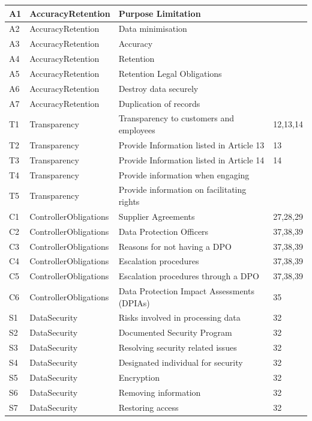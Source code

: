 \begin{center}
\begin{tabularx}{\textwidth}{|l|l|X|l|}
A1 & AccuracyRetention & Purpose Limitation &  \\ \hline
A2 & AccuracyRetention & Data minimisation &  \\ \hline
A3 & AccuracyRetention & Accuracy &  \\ \hline
A4 & AccuracyRetention & Retention &  \\ \hline
A5 & AccuracyRetention & Retention Legal Obligations &  \\ \hline
A6 & AccuracyRetention & Destroy data securely &  \\ \hline
A7 & AccuracyRetention & Duplication of records &  \\ \hline
T1 & Transparency & Transparency to customers and employees & 12,13,14 \\ \hline
T2 & Transparency & Provide Information listed in Article 13 & 13 \\ \hline
T3 & Transparency & Provide Information listed in Article 14 & 14 \\ \hline
T4 & Transparency & Provide information when engaging &  \\ \hline
T5 & Transparency & Provide information on facilitating rights &  \\ \hline
C1 & ControllerObligations & Supplier Agreements & 27,28,29 \\ \hline
C2 & ControllerObligations & Data Protection Officers & 37,38,39 \\ \hline
C3 & ControllerObligations & Reasons for not having a DPO & 37,38,39 \\ \hline
C4 & ControllerObligations & Escalation procedures & 37,38,39 \\ \hline
C5 & ControllerObligations & Escalation procedures through a DPO & 37,38,39 \\ \hline
C6 & ControllerObligations & Data Protection Impact Assessments (DPIAs) & 35 \\ \hline
S1 & DataSecurity & Risks involved in processing data & 32 \\ \hline
S2 & DataSecurity & Documented Security Program & 32 \\ \hline
S3 & DataSecurity & Resolving security related issues & 32 \\ \hline
S4 & DataSecurity & Designated individual for security & 32 \\ \hline
S5 & DataSecurity & Encryption & 32 \\ \hline
S6 & DataSecurity & Removing information & 32 \\ \hline
S7 & DataSecurity & Restoring access & 32 \\ \hline

\end{tabularx}
\end{center}
